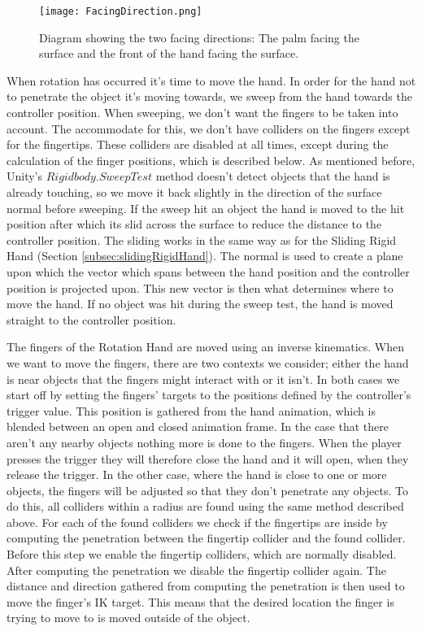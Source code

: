 \begin{figure}[H]
\centering
\texttt{[image: FacingDirection.png]}
\caption{Diagram showing the two facing directions: The palm facing the surface and the front of the hand facing the surface.}
\label{fig:rotationHandFacingDirections}
\end{figure}

When rotation has occurred it's time to move the hand. In order for the hand not to penetrate the object it's moving towards, we sweep from the hand towards the controller position. When sweeping, we don't want the fingers to be taken into account. The accommodate for this, we don't have colliders on the fingers except for the fingertips. These colliders are disabled at all times, except during the calculation of the finger positions, which is described below. As mentioned before, Unity's $Rigidbody.SweepTest$ method doesn't detect objects that the hand is already touching, so we move it back slightly in the direction of the surface normal before sweeping. If the sweep hit an object the hand is moved to the hit position after which its slid across the surface to reduce the distance to the controller position. The sliding works in the same way as for the Sliding Rigid Hand (Section \ref{subsec:slidingRigidHand}). The normal is used to create a plane upon which the vector which spans between the hand position and the controller position is projected upon. This new vector is then what determines where to move the hand. If no object was hit during the sweep test, the hand is moved straight to the controller position.

The fingers of the Rotation Hand are moved using an inverse kinematics. When we want to move the fingers, there are two contexts we consider; either the hand is near objects that the fingers might interact with or it isn't. In both cases we start off by setting the fingers' targets to the positions defined by the controller's trigger value. This position is gathered from the hand animation, which is blended between an open and closed animation frame. In the case that there aren't any nearby objects nothing more is done to the fingers. When the player presses the trigger they will therefore close the hand and it will open, when they release the trigger. In the other case, where the hand is close to one or more objects, the fingers will be adjusted so that they don't penetrate any objects. To do this, all colliders within a radius are found using the same method described above. For each of the found colliders we check if the fingertips are inside by computing the penetration between the fingertip collider and the found collider. Before this step we enable the fingertip colliders, which are normally disabled. After computing the penetration we disable the fingertip collider again. The distance and direction gathered from computing the penetration is then used to move the finger's IK target. This means that the desired location the finger is trying to move to is moved outside of the object.

